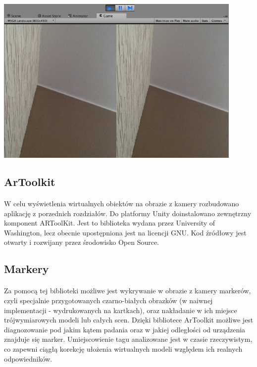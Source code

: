 \begin{center}
\includegraphics[width=0.9\textwidth]{images/kadr.jpg}
\end{center}

\subsection{ArToolkit}
\paragraph{}
W celu wyświetlenia wirtualnych obiektów na obrazie z kamery rozbudowano aplikację z porzednich rozdziałów. Do platformy Unity doinstalowano zewnętrzny komponent ARToolKit\cite{ar}. Jest to biblioteka wydana przez University of Washington\cite{ar2}, lecz obecnie upostępniona jest na licencji GNU. Kod źródłowy jest otwarty i rozwijany przez środowisko Open Source\cite{ar3}.
\subsection{Markery}
\paragraph{}
Za pomocą tej biblioteki możliwe jest wykrywanie w obrazie z kamery markerów, czyli specjalnie przygotowanych czarno-białych obrazków (w naiwnej implementacji - wydrukowanych na kartkach), oraz nakładanie w ich miejsce trójwymiarowych modeli lub całych scen. Dzięki bibliotece ArToolkit możliwe jest diagnozowanie pod jakim kątem padania oraz w jakiej odległości od urządzenia znajduje się marker. Umiejscowienie tagu analizowane jest w czasie rzeczywistym, co zapewni ciągłą korekcję ułożenia wirtualnych modeli względem ich realnych odpowiedników.

